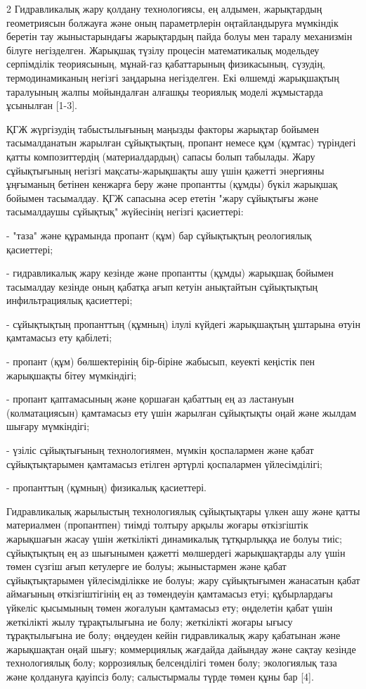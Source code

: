\begin{multicols}{2}
Гидравликалық жару қолдану технологиясы, ең алдымен, жарықтардың
геометриясын болжауға және оның параметрлерін оңтайландыруға мүмкіндік
беретін тау жыныстарындағы жарықтардың пайда болуы мен таралу механизмін
білуге негізделген. Жарықшақ түзілу процесін математикалық модельдеу
серпімділік теориясының, мұнай-газ қабаттарының физикасының, сүзудің,
термодинамиканың негізгі заңдарына негізделген. Екі өлшемді жарықшақтың
таралуының жалпы мойындалған алғашқы теориялық моделі жұмыстарда
ұсынылған {[}1-3{]}.

ҚГЖ жүргізудің табыстылығының маңызды факторы жарықтар бойымен
тасымалданатын жарылған сұйықтықтың, пропант немесе құм (құмтас)
түріндегі қатты композиттердің (материалдардың) сапасы болып табылады.
Жару сұйықтығының негізгі мақсаты-жарықшақты ашу үшін қажетті энергияны
ұңғыманың бетінен кенжарға беру және пропантты (құмды) бүкіл жарықшақ
бойымен тасымалдау. ҚГЖ сапасына әсер ететін "жару сұйықтығы және
тасымалдаушы сұйықтық" жүйесінің негізгі қасиеттері:

- "таза" және құрамында пропант (құм) бар сұйықтықтың реологиялық
қасиеттері;

- гидравликалық жару кезінде және пропантты (құмды) жарықшақ бойымен
тасымалдау кезінде оның қабатқа ағып кетуін анықтайтын сұйықтықтың
инфильтрациялық қасиеттері;

- сұйықтықтың пропанттың (құмның) ілулі күйдегі жарықшақтың ұштарына
өтуін қамтамасыз ету қабілеті;

- пропант (құм) бөлшектерінің бір-біріне жабысып, кеуекті кеңістік пен
жарықшақты бітеу мүмкіндігі;

- пропант қаптамасының және қоршаған қабаттың ең аз ластануын
(колматациясын) қамтамасыз ету үшін жарылған сұйықтықты оңай және жылдам
шығару мүмкіндігі;

- үзіліс сұйықтығының технологиямен, мүмкін қоспалармен және қабат
сұйықтықтарымен қамтамасыз етілген әртүрлі қоспалармен үйлесімділігі;

- пропанттың (құмның) физикалық қасиеттері.

Гидравликалық жарылыстың технологиялық сұйықтықтары үлкен ашу және қатты
материалмен (пропантпен) тиімді толтыру арқылы жоғары өткізгіштік
жарықшағын жасау үшін жеткілікті динамикалық тұтқырлыққа ие болуы тиіс;
сұйықтықтың ең аз шығынымен қажетті мөлшердегі жарықшақтарды алу үшін
төмен сүзгіш ағып кетулерге ие болуы; жыныстармен және қабат
сұйықтықтарымен үйлесімділікке ие болуы; жару сұйықтығымен жанасатын
қабат аймағының өткізгіштігінің ең аз төмендеуін қамтамасыз етуі;
құбырлардағы үйкеліс қысымының төмен жоғалуын қамтамасыз ету; өңделетін
қабат үшін жеткілікті жылу тұрақтылығына ие болу; жеткілікті жоғары
ығысу тұрақтылығына ие болу; өңдеуден кейін гидравликалық жару қабатынан
және жарықшақтан оңай шығу; коммерциялық жағдайда дайындау және сақтау
кезінде технологиялық болу; коррозиялық белсенділігі төмен болу;
экологиялық таза және қолдануға қауіпсіз болу; салыстырмалы түрде төмен
құны бар {[}4{]}.


\end{multicols}
